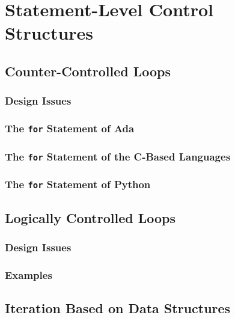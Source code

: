 \section{Statement-Level Control Structures}\label{sec:Statement_Level_Control_Structures}
\subsection{Counter-Controlled Loops}\label{subsec:Counter_Controlled_Loops}
\subsubsection{Design Issues}\label{subsubsec:Counter_Controlled_Loops-Design_Issues}
\subsubsection{The \texttt{for} Statement of Ada}\label{subsubsec:Counter_Controlled_Loops-Ada}
\subsubsection{The \texttt{for} Statement of the C-Based Languages}\label{subsubsec:Counter_Controlled_Loops-C_Langs}
\subsubsection{The \texttt{for} Statement of Python}\label{subsubsec:Counter_Controlled_Loops-Python}

\subsection{Logically Controlled Loops}\label{subsec:Logically_Controlled_Loops}
\subsubsection{Design Issues}\label{subsubsec:Logically_Controlled_Loops-Design_Issues}
\subsubsection{Examples}\label{subsubsec:Logically_Controlled_Loops-Examples}

\subsection{Iteration Based on Data Structures}\label{subsec:Iteration_Based_on_Data_Structures}

